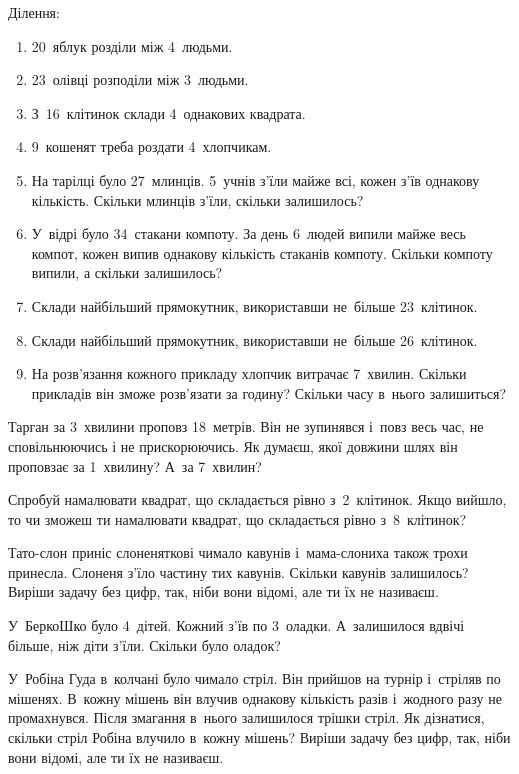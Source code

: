 \problem
Ділення:
\begin{enumerate}
    \item 20~яблук розділи між 4~людьми.
    \item 23~олівці розподіли між 3~людьми.
    \item З~16~клітинок склади 4~однакових квадрата.
    \item 9~кошенят треба роздати 4~хлопчикам.
    \item На тарілці було 27~млинців. 5~учнів з'їли майже всі,
    кожен з'їв однакову кількість.
    Скільки млинців з'їли, скільки залишилось?
    \item У~відрі було 34~стакани компоту.
    За день 6~людей випили майже весь компот,
    кожен випив однакову кількість стаканів компоту.
    Скільки компоту випили, а скільки залишилось?
    \item Склади найбільший прямокутник, використавши
    не~більше 23~клітинок.
    \item Склади найбільший прямокутник, використавши
    не~більше 26~клітинок.
    \item На розв'язання кожного прикладу хлопчик витрачає 7~хвилин.
    Скільки прикладів він зможе розв'язати за годину?
    Скільки часу в~нього залишиться?
\end{enumerate}


\problem
Тарган за 3~хвилини проповз 18~метрів.
Він не зупинявся і~повз весь час, не сповільнюючись і не прискорюючись.
Як думаєш, якої довжини шлях він проповзає за 1~хвилину?
А~за 7~хвилин?


\problem
Спробуй намалювати квадрат, що складається рівно з~2~клітинок.
Якщо вийшло, то чи зможеш ти намалювати квадрат,
що складається рівно з~8~клітинок?


\problem
{}
Тато-слон приніс слоненяткові чимало кавунів
і~мама-слониха також трохи принесла.
Слоненя з’їло частину тих кавунів.
Скільки кавунів залишилось?
Виріши задачу без цифр, так, ніби вони відомі, але ти їх не називаєш.


\problem
У~БеркоШко було 4~дітей. Кожний з’їв по 3~оладки.
А~залишилося вдвічі більше, ніж діти з’їли.
Скільки було оладок?


\problem
{}
У~Робіна Гуда в~колчані було чимало стріл.
Він прийшов на турнір і~стріляв по мішенях.
В~кожну мішень він влучив однакову кількість разів
і~жодного разу не промахнувся.
Після змагання в~нього залишилося трішки стріл.
Як дізнатися, скільки стріл Робіна влучило в~кожну мішень?
Виріши задачу без цифр, так, ніби вони відомі, але ти їх не називаєш.


